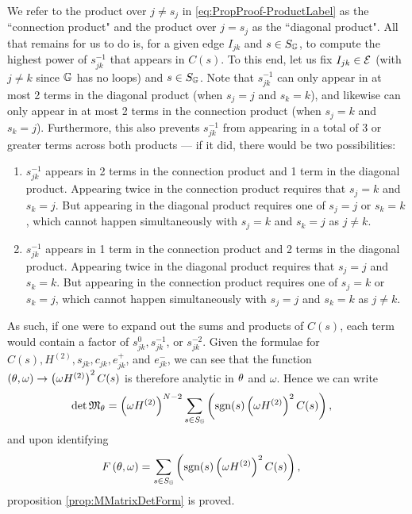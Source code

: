 We refer to the product over $j\neq s_j$ in \eqref{eq:PropProof-ProductLabel} as the ``connection product" and the product over $j=s_j$ as the ``diagonal product".
All that remains for us to do is, for a given edge $I_{jk}$ and $s\in S_{\mathbb{G}}$, to compute the highest power of $s_{jk}^{-1}$ that appears in $C(s)$.
To this end, let us fix $I_{jk}\in\mathcal{E}$ (with $j\neq k$ since $\mathbb{G}$ has no loops) and $s\in S_{\mathbb{G}}$.
Note that $s_{jk}^{-1}$ can only appear in at most 2 terms in the diagonal product (when $s_j=j$ and  $s_k=k$), and likewise can only appear in at most 2 terms in the connection product (when $s_j=k$ and $s_k=j$).
Furthermore, this also prevents $s_{jk}^{-1}$ from appearing in a total of 3 or greater terms across both products --- if it did, there would be two possibilities:
\begin{enumerate}
	\item $s_{jk}^{-1}$ appears in 2 terms in the connection product and 1 term in the diagonal product.
	Appearing twice in the connection product requires that $s_j=k$ and $s_k=j$.
	But appearing in the diagonal product requires one of $s_j=j$ or $s_k=k$, which cannot happen simultaneously with $s_j=k$ and $s_k=j$ as $j\neq k$.
	\item $s_{jk}^{-1}$ appears in 1 term in the connection product and 2 terms in the diagonal product.
	Appearing twice in the diagonal product requires that $s_j=j$ and $s_k=k$.
	But appearing in the connection product requires one of $s_j=k$ or $s_k=j$, which cannot happen simultaneously with $s_j=j$ and $s_k=k$ as $j\neq k$.
\end{enumerate}
As such, if one were to expand out the sums and products of $C(s)$, each term would contain a factor of $s_{jk}^{0}, s_{jk}^{-1}$, or $s_{jk}^{-2}$.
Given the formulae for $C(s), H^{(2)}, s_{jk}, c_{jk}, e_{jk}^+$, and $e_{jk}^-$, we can see that the function $\left( \theta, \omega \right)\rightarrow\left(  \omega H^{(2)}  \right)^2 C(s)$ is therefore analytic in $\theta$ and $\omega$.
Hence we can write
\begin{align*}
	\det\mathfrak{M}_{\theta} &= \left(  \omega H^{(2)}  \right)^{N-2} \sum_{s\in S_{\mathbb{G}}} \left(  \mathrm{sgn}(s) \left(  \omega H^{(2)}  \right)^2 C(s)  \right),
\end{align*}
and upon identifying
\begin{align*}
	F\left( \theta, \omega \right) &= \sum_{s\in S_{\mathbb{G}}} \left(  \mathrm{sgn}(s) \left(  \omega H^{(2)}  \right)^2 C(s)  \right),
\end{align*}
proposition \ref{prop:MMatrixDetForm} is proved.

